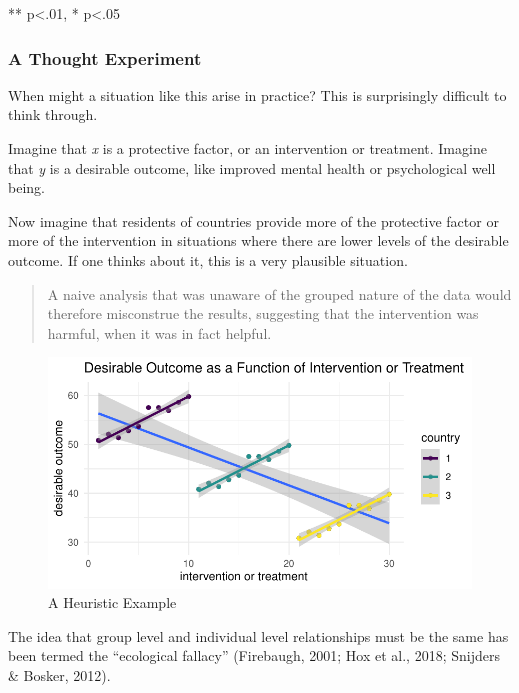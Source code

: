 \documentclass[
  letterpaper,
  DIV=11,
  numbers=noendperiod]{scrreprt}
\begin{document}
** p\textless.01, * p\textless.05

\subsubsection{A Thought Experiment}\label{a-thought-experiment}

When might a situation like this arise in practice? This is surprisingly
difficult to think through.

Imagine that \emph{x} is a protective factor, or an intervention or
treatment. Imagine that \emph{y} is a desirable outcome, like improved
mental health or psychological well being.

Now imagine that residents of countries provide more of the protective
factor or more of the intervention in situations where there are lower
levels of the desirable outcome. If one thinks about it, this is a very
plausible situation.

\begin{quote}
A naive analysis that was unaware of the grouped nature of the data
would therefore misconstrue the results, suggesting that the
intervention was harmful, when it was in fact helpful.
\end{quote}

\begin{figure}[H]

{\centering \includegraphics{cross-sectional_files/figure-pdf/unnamed-chunk-9-1.pdf}

}

\caption{A Heuristic Example}

\end{figure}%

The idea that group level and individual level relationships must be the
same has been termed the ``ecological fallacy'' (Firebaugh, 2001; Hox et
al., 2018; Snijders \& Bosker, 2012). 
\end{document}
